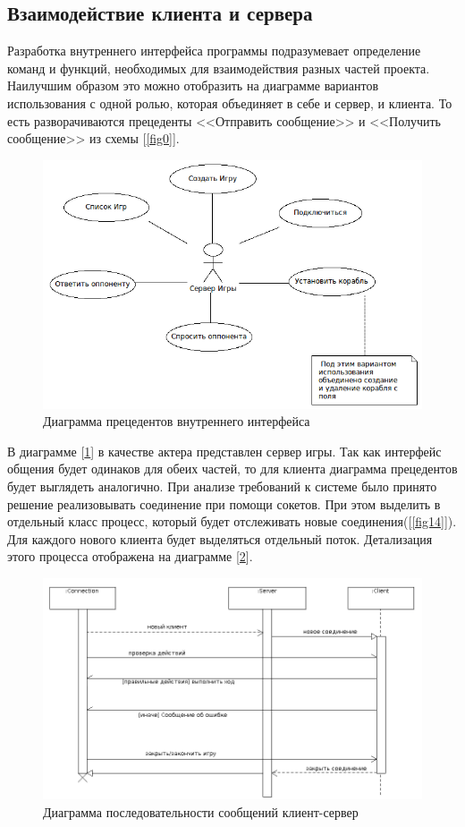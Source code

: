 ﻿\subsection{Взаимодействие клиента и сервера}
  Разработка внутреннего интерфейса программы подразумевает определение команд и функций, необходимых для взаимодействия разных частей проекта. Наилучшим образом это можно отобразить на диаграмме вариантов использования с одной ролью, которая объединяет в себе и сервер, и клиента. То есть разворачиваются прецеденты <<Отправить сообщение>> и <<Получить сообщение>> из схемы [\ref{fig0}].  

\begin{figure}[ht]
\centering
\includegraphics[width=15cm]{images/interface.png}
\caption{Диаграмма прецедентов внутреннего интерфейса}
\label{fig3}
\end{figure}

В диаграмме [\ref{fig3}] в качестве актера представлен сервер игры. Так как интерфейс общения будет одинаков для обеих частей, то для клиента диаграмма прецедентов будет выглядеть аналогично. При анализе требований к системе было принято решение реализовывать соединение при помощи сокетов. При этом выделить в отдельный класс процесс, который будет отслеживать новые соединения([\ref{fig14}]). Для каждого нового клиента будет выделяться отдельный поток. Детализация этого процесса отображена на диаграмме [\ref{fig4}].

\begin{figure}[ht]
\centering
\includegraphics[width=16cm]{images/par.png}
\caption{Диаграмма последовательности сообщений клиент-сервер}
\label{fig4}
\end{figure}

